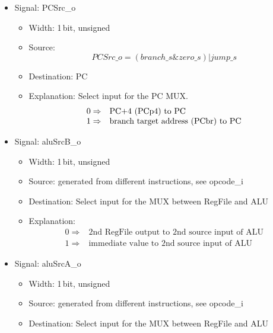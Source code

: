 \begin{itemize}
\begin{itemize}
    \item Explanation: Read-enable for D-Mem; check if realy needed
  \end{itemize}
  \item Signal: PCSrc\_o
  \begin{itemize}
    \item Width: 1\,bit, unsigned
    \item Source: \[ PCSrc\_o=(branch\_s \& zero\_s) | jump\_s \]
    \item Destination: PC
    \item Explanation: Select input for the PC MUX. \[ \begin{array}{ll} 
                                                                                                        0 \Rightarrow & $PC+4$ \mbox{ (PCp4) to PC} \\ 
                                                                                                        1 \Rightarrow & \mbox{branch target address (PCbr) to PC} 
                                                                                                      \end{array} \]
  \end{itemize}
  \item Signal: aluSrcB\_o
  \begin{itemize}
    \item Width: 1\,bit, unsigned
    \item Source: generated from different instructions, see opcode\_i
    \item Destination: Select input for the MUX between RegFile and ALU
    \item Explanation: \[ \begin{array}{ll} 
                                              0 \Rightarrow & \mbox{2nd RegFile output to 2nd source input of ALU} \\ 
                                              1 \Rightarrow & \mbox{immediate value to 2nd source input of ALU} 
                                              \end{array} \]
  \end{itemize}
  \item Signal: aluSrcA\_o
  \begin{itemize}
    \item Width: 1\,bit, unsigned
    \item Source: generated from different instructions, see opcode\_i
    \item Destination: Select input for the MUX between RegFile and ALU

\end{itemize}
\end{itemize}
